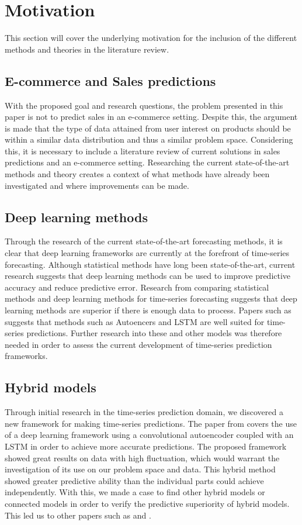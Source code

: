 \section{Motivation}
\label{section:BT:Motivation}

This section will cover the underlying motivation for the inclusion of the different methods and theories in the literature review.


\subsection{E-commerce and Sales predictions}
With the proposed goal and research questions, the problem presented in this paper is not to predict sales in an e-commerce setting.
Despite this, the argument is made that the type of data attained from user interest on products should be within a similar data distribution and thus a similar problem space.
Considering this, it is necessary to include a literature review of current solutions in sales predictions and an e-commerce setting.
Researching the current state-of-the-art methods and theory creates a context of what methods have already been investigated and where improvements can be made. 


\subsection{Deep learning methods}
Through the research of the current state-of-the-art forecasting methods,
it is clear that deep learning frameworks are currently at the forefront of time-series forecasting.
Although statistical methods have long been state-of-the-art, current research suggests that deep learning methods can be used to improve predictive accuracy and reduce predictive error.
Research from \cite{Makridakis2018} comparing statistical methods and deep learning methods for time-series forecasting suggests that deep learning methods are superior if there is enough data to process.
Papers such as \cite{Laptev} suggests that methods such as Autoencers and LSTM are well suited for time-series predictions.
Further research into these and other models was therefore needed in order to assess the current development of time-series prediction frameworks.


\subsection{Hybrid models}
Through initial research in the time-series prediction domain,
we discovered a new framework for making time-series predictions.
The paper from \cite{Zhao2019} covers the use of a deep learning framework using a convolutional autoencoder
coupled with an LSTM in order to achieve more accurate predictions.
The proposed framework showed great results on data with high fluctuation,
which would warrant the investigation of its use on our problem space and data.
This hybrid method showed greater predictive ability than the individual parts could achieve independently.
With this, we made a case to find other hybrid models or connected models in order to verify the predictive superiority of hybrid models.
This led us to other papers such as \cite{Khan2020} and \cite{Bowen2020}.

